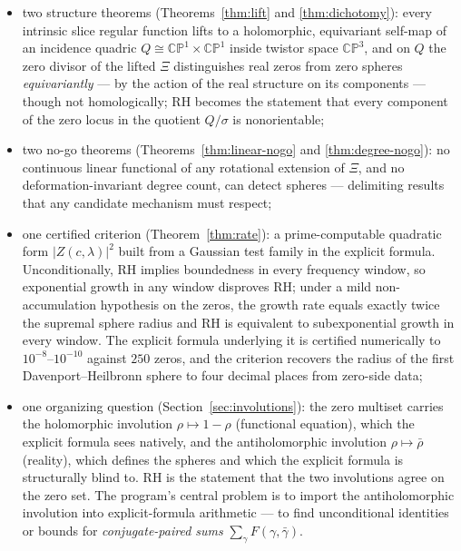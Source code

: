 \documentclass[11pt]{amsart}
\theoremstyle{plain}
\theoremstyle{definition}
\theoremstyle{remark}
\newcommand{\CP}{\mathbb{CP}}
\begin{document}
\begin{itemize}
\item two structure theorems (Theorems~\ref{thm:lift} and \ref{thm:dichotomy}): every intrinsic
slice regular function lifts to a holomorphic, equivariant self-map of an incidence quadric
$Q\cong\CP^1\times\CP^1$ inside twistor space $\CP^3$, and on $Q$ the zero divisor of the lifted
$\Xi$ distinguishes real zeros from zero spheres \emph{equivariantly} --- by the action of the real
structure on its components --- though not homologically; RH becomes the statement that every
component of the zero locus in the quotient $Q/\sigma$ is nonorientable;
\item two no-go theorems (Theorems~\ref{thm:linear-nogo} and \ref{thm:degree-nogo}): no continuous
linear functional of any rotational extension of $\Xi$, and no deformation-invariant degree count,
can detect spheres --- delimiting results that any candidate mechanism must respect;
\item one certified criterion (Theorem~\ref{thm:rate}): a prime-computable quadratic form
$|Z(c,\lambda)|^2$ built from a Gaussian test family in the explicit formula. Unconditionally, RH
implies boundedness in every frequency window, so exponential growth in any window disproves RH;
under a mild non-accumulation hypothesis on the zeros, the growth rate equals exactly twice the
supremal sphere radius and RH is equivalent to subexponential growth in every window. The explicit
formula underlying it is certified numerically to $10^{-8}$--$10^{-10}$ against $250$ zeros, and
the criterion recovers the radius of the first Davenport--Heilbronn sphere to four decimal places
from zero-side data;
\item one organizing question (Section~\ref{sec:involutions}): the zero multiset carries the
holomorphic involution $\rho\mapsto1-\rho$ (functional equation), which the explicit formula sees
natively, and the antiholomorphic involution $\rho\mapsto\bar\rho$ (reality), which defines the
spheres and which the explicit formula is structurally blind to. RH is the statement that the two
involutions agree on the zero set. The program's central problem is to import the antiholomorphic
involution into explicit-formula arithmetic --- to find unconditional identities or bounds for
\emph{conjugate-paired sums} $\sum_\gamma F(\gamma,\bar\gamma)$.
\end{itemize}
\end{document}
